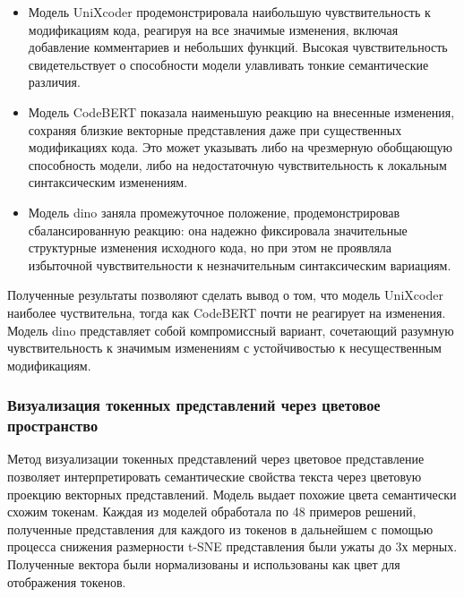 \documentclass[../part_3.tex]{subfiles}
\begin{document}
\begin{itemize}
    \item Модель UniXcoder продемонстрировала наибольшую чувствительность к модификациям кода, реагируя на все значимые изменения, включая добавление комментариев и небольших функций. Высокая чувствительность свидетельствует о способности модели улавливать тонкие семантические различия.

    \item Модель CodeBERT показала наименьшую реакцию на внесенные изменения, сохраняя близкие векторные представления даже при существенных модификациях кода. Это может указывать либо на чрезмерную обобщающую способность модели, либо на недостаточную чувствительность к локальным синтаксическим изменениям.

    \item Модель \acrshort{dino} заняла промежуточное положение, продемонстрировав сбалансированную реакцию: она надежно фиксировала значительные структурные изменения исходного кода, но при этом не проявляла избыточной чувствительности к незначительным синтаксическим вариациям.
\end{itemize}

\par Полученные результаты позволяют сделать вывод о том, что модель UniXcoder наиболее чуствительна, тогда как CodeBERT почти не реагирует на изменения. Модель \acrshort{dino} представляет собой компромиссный вариант, сочетающий разумную чувствительность к значимым изменениям с устойчивостью к несущественным модификациям.
\subsubsection{Визуализация токенных представлений через цветовое пространство}
\par Метод визуализации токенных представлений через цветовое представление позволяет интерпретировать семантические свойства текста через цветовую проекцию векторных представлений. Модель выдает похожие цвета семантически схожим токенам. Каждая из моделей обработала по 48 примеров решений, полученные представления для каждого из токенов в дальнейшем с помощью процесса снижения размерности t-SNE\cite{tsne} представления были ужаты до 3х мерных. Полученные вектора были нормализованы и использованы как цвет для отображения токенов.
\end{document}
